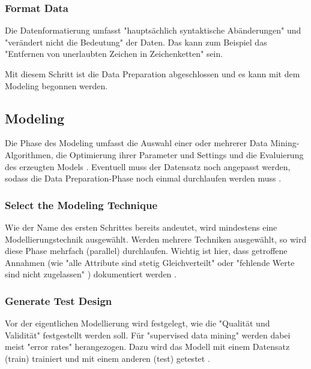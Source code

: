 \subsubsection{Format Data}
Die Datenformatierung umfasst "hauptsächlich syntaktische Abänderungen" und "verändert nicht die Bedeutung" \citep[S.~22; eigene Übersetzung]{chapman_crisp-dm_2000} der Daten. Das kann zum Beispiel das "Entfernen von unerlaubten Zeichen in Zeichenketten" \citep[S.~17; eigene Übersetzung]{shearer_crisp-dm_2000} sein.\par
Mit diesem Schritt ist die Data Preparation abgeschlossen und es kann mit dem Modeling begonnen werden.

\subsection{Modeling}
Die Phase des Modeling umfasst die Auswahl einer oder mehrerer Data Mining-Algorithmen, die Optimierung ihrer Parameter und Settings und die Evaluierung des erzeugten Models . Eventuell muss der Datensatz noch angepasst werden, sodass die Data Preparation-Phase noch einmal durchlaufen werden muss \citep[Punkt 1.4.1.4]{larose_discovering_2014}.

\subsubsection{Select the Modeling Technique}
Wie der Name des ersten Schrittes bereits andeutet, wird mindestens eine Modellierungstechnik ausgewählt. Werden mehrere Techniken ausgewählt, so wird diese Phase mehrfach (parallel) durchlaufen. Wichtig ist hier, dass getroffene Annahmen (wie "alle Attribute sind stetig Gleichverteilt" oder "fehlende Werte sind nicht zugelassen" \citep[S.~24]{chapman_crisp-dm_2000}) dokumentiert werden \citep[S.~17]{shearer_crisp-dm_2000}.

\subsubsection{Generate Test Design}
Vor der eigentlichen Modellierung wird festgelegt, wie die "Qualität und Validität" \citep[S.~24]{chapman_crisp-dm_2000} festgestellt werden soll. Für "supervised data mining" werden dabei meist "error rates" \citep[S.~24]{chapman_crisp-dm_2000} herangezogen. Dazu wird das Modell mit einem Datensatz (\gls{train}) trainiert und mit einem anderen (\gls{test}) getestet \citep{shearer_crisp-dm_2000}.


